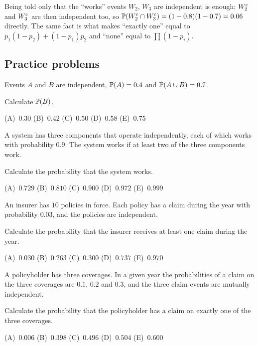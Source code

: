\begin{trap}
Being told only that the ``works'' events $W_2$, $W_3$ are independent is enough: $W_2^{\mathrm{c}}$ and $W_3^{\mathrm{c}}$ are then independent too, so $\mathbb{P}(W_2^{\mathrm{c}} \cap W_3^{\mathrm{c}}) = (1 - 0.8)(1 - 0.7) = 0.06$ directly. The same fact is what makes ``exactly one'' equal to $p_1(1-p_2) + (1-p_1)p_2$ and ``none'' equal to $\prod (1 - p_i)$.
\end{trap}

\subsection{Practice problems}

\begin{practice}
Events $A$ and $B$ are independent, $\mathbb{P}(A) = 0.4$ and $\mathbb{P}(A \cup B) = 0.7$.

Calculate $\mathbb{P}(B)$.

\begin{center}
(A)~$0.30$ \quad (B)~$0.42$ \quad (C)~$0.50$ \quad (D)~$0.58$ \quad (E)~$0.75$
\end{center}
\end{practice}

\begin{practice}
A system has three components that operate independently, each of which works with probability $0.9$. The system works if at least two of the three components work.

Calculate the probability that the system works.

\begin{center}
(A)~$0.729$ \quad (B)~$0.810$ \quad (C)~$0.900$ \quad (D)~$0.972$ \quad (E)~$0.999$
\end{center}
\end{practice}

\begin{practice}
An insurer has $10$ policies in force. Each policy has a claim during the year with probability $0.03$, and the policies are independent.

Calculate the probability that the insurer receives at least one claim during the year.

\begin{center}
(A)~$0.030$ \quad (B)~$0.263$ \quad (C)~$0.300$ \quad (D)~$0.737$ \quad (E)~$0.970$
\end{center}
\end{practice}

\begin{practice}
A policyholder has three coverages. In a given year the probabilities of a claim on the three coverages are $0.1$, $0.2$ and $0.3$, and the three claim events are mutually independent.

Calculate the probability that the policyholder has a claim on exactly one of the three coverages.

\begin{center}
(A)~$0.006$ \quad (B)~$0.398$ \quad (C)~$0.496$ \quad (D)~$0.504$ \quad (E)~$0.600$
\end{center}
\end{practice}

